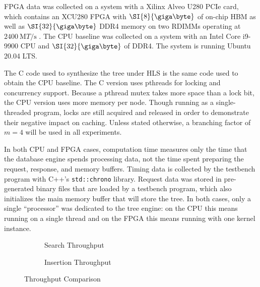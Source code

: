 

FPGA data was collected on a system with a Xilinx Alveo U280 PCIe card,
which contains an XCU280 FPGA with $\SI{8}{\giga\byte}$ of on-chip HBM as well
as $\SI{32}{\giga\byte}$ DDR4 memory on two RDIMMs operating at
$\SI{2400}{\mega{T}\per\second}$ \autocite{u280}. The CPU baseline was collected
on a system with an Intel Core i9-9900 CPU and $\SI{32}{\giga\byte}$ of DDR4.
The system is running Ubuntu 20.04 LTS.

The C code used to synthesize the tree under HLS is the same code used to obtain
the CPU baseline. The C version uses pthreads for locking and concurrency
support. Because a pthread mutex takes more space than a lock bit, the CPU
version uses more memory per node. Though running as a single-threaded program,
locks are still acquired and released in order to demonstrate their negative
impact on caching.
%
Unless stated otherwise, a branching factor of $m=4$ will be used in all
experiments.



In both CPU and FPGA cases, computation time measures only the time that the
database engine spends processing data, not the time spent preparing the
request, response, and memory buffers. Timing data is collected by the testbench
program with C++'s \texttt{std::chrono} library.
%
Request data was stored in pre-generated binary files that are loaded by a
testbench program, which also initializes the main memory buffer that will store
the tree.
%
In both cases, only a single ``processor'' was dedicated to the tree engine: on
the CPU this means running on a single thread and on the FPGA this means running
with one kernel instance.



\begin{figure}[H]
	\centering
	\begin{subfigure}{7.5cm}
		\centering
		
		\caption{Search Throughput}
		\label{fig:search-throughput-comparison}
	\end{subfigure}
	\begin{subfigure}{7.5cm}
		\centering
		
		\caption{Insertion Throughput}
		\label{fig:insert-throughput-comparison}
	\end{subfigure}
	\caption{Throughput Comparison}
	\label{fig:throughput-comparison}
\end{figure}

